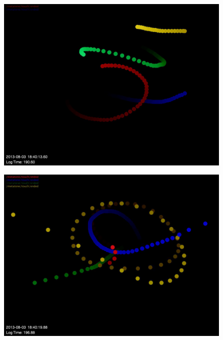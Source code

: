 \documentclass[graybox]{svmult}
\begin{document}
\begin{figure}
  \centering
  \includegraphics[width=\textwidth]{figures/metatoneanimation1}
  \label{metatoneanimation1}
\end{figure}
\begin{figure}
  \centering
  \includegraphics[width=\textwidth]{figures/metatoneanimation3}
  \label{metatoneanimation2}
\end{figure}
\end{document}
